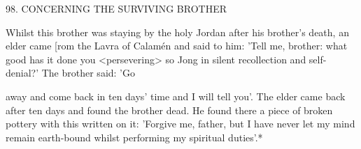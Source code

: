 98. CONCERNING THE SURVIVING BROTHER

Whilst this brother was staying by the holy Jordan after his
brother's death, an elder came [rom the Lavra of Calamén and said
to him: 'Tell me, brother: what good has it done you <persevering>
so Jong in silent recollection and self-denial?' The brother said: 'Go

away and come back in ten days' time and I will tell you'. The elder
came back after ten days and found the brother dead. He found
there a piece of broken pottery with this written on it: 'Forgive me,
father, but I have never let my mind remain earth-bound whilst
performing my spiritual duties'.*

